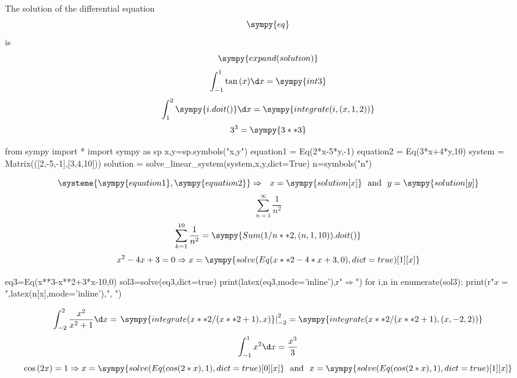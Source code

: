 \documentclass[a4paper,11pt]{article}
\begin{document}
The solution of the differential equation
\[ \sympy{eq} \]
is
\[ \sympy{expand(solution)} \]
\[ \int_{-1}^{1}{\tan{(x)}\d x}=\sympy{int3} \]
\[ \int_{1}^{2}{\sympy{i.doit()}\d x}=\sympy{integrate(i,(x,1,2))} \]
\[ 3^3=\sympy{3**3} \]
\begin{sympycode}
from sympy import *
import sympy as sp
x,y=sp.symbols("x,y")
equation1 = Eq(2*x-5*y,-1)
equation2 = Eq(3*x+4*y,10)
system = Matrix(([2,-5,-1],[3,4,10]))
solution = solve_linear_system(system,x,y,dict=True)
n=symbols("n")
\end{sympycode}
\[ \systeme{\sympy{equation1},\sympy{equation2}}\Rightarrow \ \ x=\sympy{solution[x]}\ \ \textrm{and}\ \ y=\sympy{solution[y]} \]
\[ \sum_{n=1}^{\infty}{\frac{1}{n^2}} \]
\[ \sum_{k=1}^{10}{\frac{1}{n^2}}=\sympy{Sum(1/n**2,(n,1,10)).doit()} \]
\[ x^2-4x+3=0\Rightarrow x=\sympy{solve(Eq(x**2-4*x+3,0),dict=true)[1][x]} \]
\begin{sympycode}
eq3=Eq(x**3-x**2+3*x-10,0)
sol3=solve(eq3,dict=true)
print(latex(eq3,mode='inline'),r"$ \Rightarrow $")
for i,n in enumerate(sol3):
	print(r"$ x= $",latex(n[x],mode='inline'),", ")
\end{sympycode}
\[ \int_{-2}^{2}{\frac{x^2}{x^2+1}\d x}=\left.\sympy{integrate(x**2/(x**2+1),x)}\right|_{-2}^{2}=\sympy{integrate(x**2/(x**2+1),(x,-2,2))} \]
\[ \int_{-1}^{1}{x^2\d x}=\frac{x^3}{3} \]
\[ \cos{(2x)}=1\Rightarrow x=\sympy{solve(Eq(cos(2*x),1),dict=true)[0][x]}\ \ \textrm{and}\ \ x=\sympy{solve(Eq(cos(2*x),1),dict=true)[1][x]} \]
\end{document}
